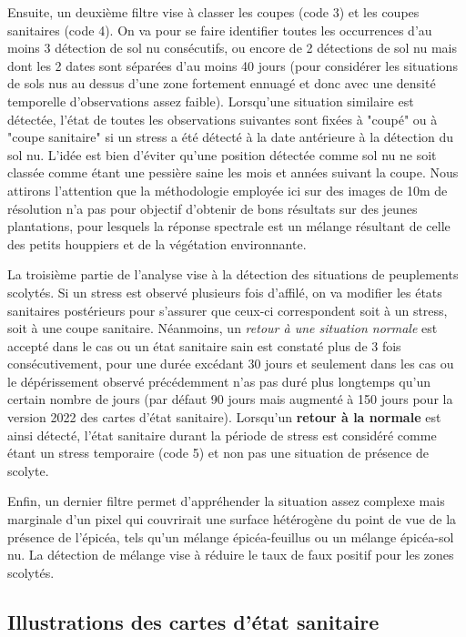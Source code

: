 \documentclass[a4paper, 12pt]{article} %
\begin{document}
Ensuite, un deuxième filtre vise à classer les coupes (code 3) et les coupes sanitaires (code 4). On va pour se faire identifier toutes les occurrences d'au moins 3 détection de sol nu consécutifs, ou encore de 2 détections de sol nu mais dont les 2 dates sont séparées d'au moins 40 jours (pour considérer les situations de sols nus au dessus d'une zone fortement ennuagé et donc avec une densité temporelle d'observations assez faible). Lorsqu'une situation similaire est détectée, l'état de toutes les observations suivantes sont fixées à "coupé" ou à "coupe sanitaire" si un stress a été détecté à la date antérieure à la détection du sol nu. L'idée est bien d'éviter qu'une position détectée comme sol nu ne soit classée comme étant une pessière saine les mois et années suivant la coupe. Nous attirons l'attention que la méthodologie employée ici sur des images de 10m de résolution n'a pas pour objectif d'obtenir de bons résultats sur des jeunes plantations, pour lesquels la réponse spectrale est un mélange résultant de celle des petits houppiers et de la végétation environnante.

La troisième partie de l'analyse vise à la détection des situations de peuplements scolytés. Si un stress est observé plusieurs fois d'affilé, on va modifier les états sanitaires postérieurs pour s'assurer que ceux-ci correspondent soit à un stress, soit à une coupe sanitaire. Néanmoins, un \textit{retour à une situation normale} est accepté dans le cas ou un état sanitaire sain est constaté plus de 3 fois consécutivement, pour une durée excédant 30 jours et seulement dans les cas ou le dépérissement observé précédemment n'as pas duré plus longtemps qu'un certain nombre de jours (par défaut 90 jours mais augmenté à 150 jours pour la version 2022 des cartes d'état sanitaire). Lorsqu'un \textbf{retour à la normale} est ainsi détecté, l'état sanitaire durant la période de stress est considéré comme étant un stress temporaire (code 5) et non pas une situation de présence de scolyte.

Enfin, un dernier filtre permet d'appréhender la situation assez complexe mais marginale d'un pixel qui couvrirait une surface hétérogène du point de vue de la présence de l'épicéa, tels qu'un mélange épicéa-feuillus ou un mélange épicéa-sol nu. La détection de mélange vise à réduire le taux de faux positif pour les zones scolytés.

\subsection{Illustrations des cartes d'état sanitaire}
\end{document}
